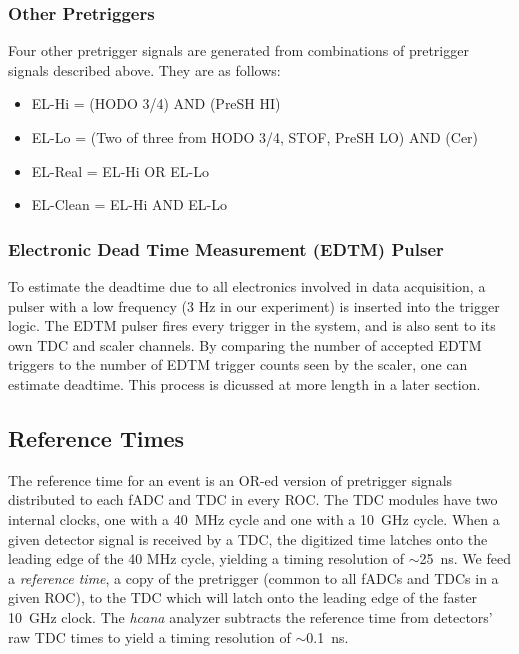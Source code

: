 \subsubsection{Other Pretriggers}
Four other pretrigger signals are generated from combinations of pretrigger
signals described above.
They are as follows:

\begin{itemize}
    \item EL-Hi = (HODO 3/4) AND (PreSH HI)
    \item EL-Lo = (Two of three from {HODO 3/4, STOF, PreSH LO}) AND (Cer)
    \item EL-Real = EL-Hi OR EL-Lo
    \item EL-Clean = EL-Hi AND EL-Lo
\end{itemize}

\subsubsection{Electronic Dead Time Measurement (EDTM) Pulser}
To estimate the deadtime due to all electronics involved in data acquisition, a
pulser with a low frequency (3 Hz in our experiment) is inserted into the
trigger logic.
The EDTM pulser fires every trigger in the system, and is also sent to its own
TDC and scaler channels.
By comparing the number of accepted EDTM triggers to the number of EDTM trigger
counts seen by the scaler, one can estimate deadtime.
This process is dicussed at more length in a later section.

\subsection{Reference Times}
The reference time for an event is an OR-ed version of pretrigger signals
distributed to each fADC and TDC in every ROC.
The TDC modules have two internal clocks, one with a \SI{40}{MHz} cycle and one
with a \SI{10}{GHz} cycle.
When a given detector signal is received by a TDC, the digitized time latches
onto the leading edge of the 40 MHz cycle, yielding a timing resolution of
$\sim$\SI{25}{ns}.
We feed a \textit{reference time}, a copy of the pretrigger (common to all
fADCs and TDCs in a given ROC), to the TDC which will latch onto the leading
edge of the faster \SI{10}{GHz} clock.
The \textit{hcana} analyzer subtracts the reference time from detectors' raw
TDC times to yield a timing resolution of $\sim$\SI{0.1}{ns}.

